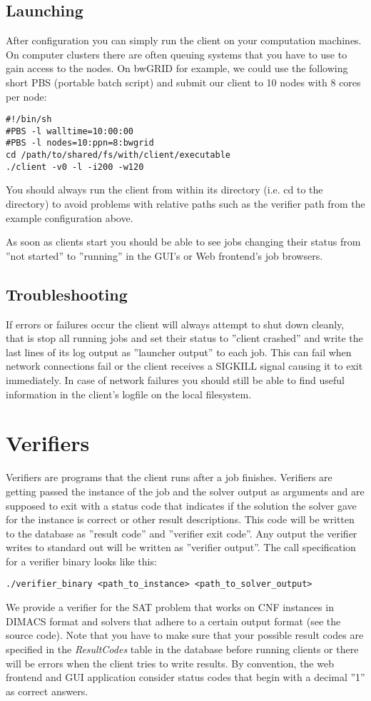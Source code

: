 \documentclass{article}
\begin{document}
\subsection{Launching}
After configuration you can simply run the client on your computation machines. On computer clusters there are often queuing systems that you have to use to gain access to the nodes.
On bwGRID for example, we could use the following short PBS (portable batch script) and submit our client to 10 nodes with 8 cores per node:
\begin{verbatim}
#!/bin/sh
#PBS -l walltime=10:00:00
#PBS -l nodes=10:ppn=8:bwgrid
cd /path/to/shared/fs/with/client/executable
./client -v0 -l -i200 -w120
\end{verbatim}
You should always run the client from within its directory (i.e. cd to the directory) to avoid problems with relative paths such as the verifier path from the example configuration above.

As soon as clients start you should be able to see jobs changing their status from ''not started'' to ''running'' in the GUI's or Web frontend's job browsers.

\subsection{Troubleshooting}
If errors or failures occur the client will always attempt to shut down cleanly, that is stop all running jobs and set their status to ''client crashed'' and write
the last lines of its log output as ''launcher output'' to each job. This can fail when network connections fail or the client receives a SIGKILL signal causing it to exit immediately.
In case of network failures you should still be able to find useful information in the client's logfile on the local filesystem.

\section{Verifiers}
Verifiers are programs that the client runs after a job finishes. Verifiers are getting passed the instance of the job and the solver output as arguments and are supposed to exit with a status code
that indicates if the solution the solver gave for the instance is correct or other result descriptions. This code will be written to the database as ''result code'' and ''verifier exit code''. Any output the verifier writes to standard out will
be written as ''verifier output''. The call specification for a verifier binary looks like this:
\begin{verbatim}
./verifier_binary <path_to_instance> <path_to_solver_output>
\end{verbatim}
We provide a verifier for the SAT problem that works on CNF instances in DIMACS format and solvers that adhere to a certain output format (see the source code). Note that you have to make sure
that your possible result codes are specified in the \textit{ResultCodes} table in the database before running clients or there will be errors when the client tries to write results. By convention,
the web frontend and GUI application consider status codes that begin with a decimal ''1'' as correct answers.
\end{document}
